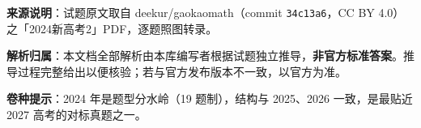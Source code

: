 

\begin{gknotice}
\textbf{来源说明}：试题原文取自 deekur/gaokaomath（commit \texttt{34c13a6}，CC BY 4.0）之「2024新高考2」PDF，逐题照图转录。

\textbf{解析归属}：本文档全部解析由本库编写者根据试题独立推导，\textbf{非官方标准答案}。推导过程完整给出以便核验；若与官方发布版本不一致，以官方为准。

\textbf{卷种提示}：2024 年是题型分水岭（19 题制），结构与 2025、2026 一致，是最贴近 2027 高考的对标真题之一。
\end{gknotice}

\par\medskip


